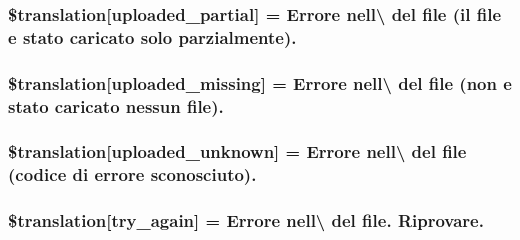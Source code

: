 \subsubsection[{\$translation}]{\setlength{\rightskip}{0pt plus 5cm}\$translation\mbox{[}\textquotesingle{}uploaded\+\_\+partial\textquotesingle{}\mbox{]} = \textquotesingle{}Errore nell\textbackslash{} del file (il file e stato caricato solo parzialmente).\textquotesingle{}}\label{class_8upload_8it___i_t_8php_a967c17da21b0a2d3bd65cca3a9ca0ea8}
\hypertarget{class_8upload_8it___i_t_8php_a0cce433260be65f1f35853a6b4b8952b}{}
\subsubsection[{\$translation}]{\setlength{\rightskip}{0pt plus 5cm}\$translation\mbox{[}\textquotesingle{}uploaded\+\_\+missing\textquotesingle{}\mbox{]} = \textquotesingle{}Errore nell\textbackslash{} del file (non e stato caricato nessun file).\textquotesingle{}}\label{class_8upload_8it___i_t_8php_a0cce433260be65f1f35853a6b4b8952b}
\hypertarget{class_8upload_8it___i_t_8php_a4a9168e922b827e6a28b5db1c00774ca}{}
\subsubsection[{\$translation}]{\setlength{\rightskip}{0pt plus 5cm}\$translation\mbox{[}\textquotesingle{}uploaded\+\_\+unknown\textquotesingle{}\mbox{]} = \textquotesingle{}Errore nell\textbackslash{} del file (codice di errore sconosciuto).\textquotesingle{}}\label{class_8upload_8it___i_t_8php_a4a9168e922b827e6a28b5db1c00774ca}
\hypertarget{class_8upload_8it___i_t_8php_a3afc377bd803683314f413a814243066}{}
\subsubsection[{\$translation}]{\setlength{\rightskip}{0pt plus 5cm}\$translation\mbox{[}\textquotesingle{}try\+\_\+again\textquotesingle{}\mbox{]} = \textquotesingle{}Errore nell\textbackslash{} del file. Riprovare.\textquotesingle{}}\label{class_8upload_8it___i_t_8php_a3afc377bd803683314f413a814243066}
\hypertarget{class_8upload_8it___i_t_8php_a476278eb4a0c3df56af068e2d511a741}{}

